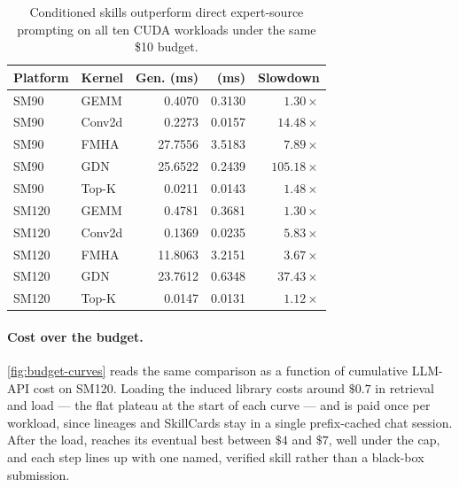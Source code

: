 \begin{table}[t]
  \centering
  \small
  \setlength{\tabcolsep}{6pt}
  \begin{tabular}{@{}llrrr@{}}
    \toprule
    \textbf{Platform} & \textbf{Kernel} & \textbf{Gen. (ms)} & \textbf{\sys{} (ms)} & \textbf{Slowdown} \\
    \midrule
    SM90  & GEMM   & 0.4070  & 0.3130 & $1.30\times$ \\
    SM90  & Conv2d & 0.2273  & 0.0157 & $14.48\times$ \\
    SM90  & FMHA   & 27.7556 & 3.5183 & $7.89\times$ \\
    SM90  & GDN    & 25.6522 & 0.2439 & $105.18\times$ \\
    SM90  & Top-K  & 0.0211  & 0.0143 & $1.48\times$ \\
    \midrule
    SM120 & GEMM   & 0.4781  & 0.3681 & $1.30\times$ \\
    SM120 & Conv2d & 0.1369  & 0.0235 & $5.83\times$ \\
    SM120 & FMHA   & 11.8063 & 3.2151 & $3.67\times$ \\
    SM120 & GDN    & 23.7612 & 0.6348 & $37.43\times$ \\
    SM120 & Top-K  & 0.0147  & 0.0131 & $1.12\times$ \\
    \bottomrule
  \end{tabular}
  \caption{Conditioned skills outperform direct expert-source prompting on all ten CUDA workloads under the same \$10 budget.}
  \label{tab:expert-source-ablation}
\end{table}


\paragraph{Cost over the budget.}
\autoref{fig:budget-curves} reads the same comparison as a function of cumulative LLM-API cost on
SM120. Loading the induced library costs around $\$0.7$ in retrieval and load --- the flat plateau
at the start of each \sys{} curve --- and is paid once per workload, since lineages and SkillCards
stay in a single prefix-cached chat session. After the load, \sys{} reaches its eventual best
between $\$4$ and $\$7$, well under the cap, and each step lines up with one named, verified skill
rather than a black-box submission.

